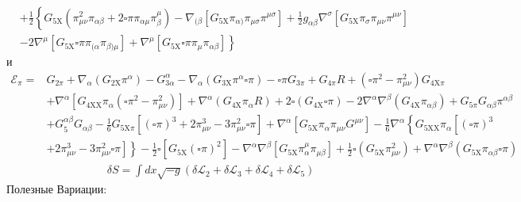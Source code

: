 \documentclass[12pt,a4paper,svgnames]{extarticle}
\begin{document}
\begin{align*}
&+\frac{1}{2}\left\{G_{5 \mathrm{X}}\left(\pi_{\mu \nu}^{2} \pi_{\alpha \beta}+2 \square \pi \pi_{\alpha \mu} \pi_{\beta}^{\mu}\right)-\nabla_{(\beta}\left[G_{5 \mathrm{X}} \pi_{\alpha)} \pi_{\mu \sigma} \pi^{\mu \sigma}\right]+\frac{1}{2} g_{\alpha \beta} \nabla^{\sigma}\left[G_{5 \mathrm{X}} \pi_{\sigma} \pi_{\mu \nu} \pi^{\mu \nu}\right]\right.\\
&\left.-2 \nabla^{\mu}\left[G_{5 \mathrm{X}} \square \pi \pi_{(\alpha} \pi_{\beta) \mu}\right]+\nabla^{\mu}\left[G_{5 \mathrm{X}} \square \pi \pi_{\mu} \pi_{\alpha \beta}\right]\right\}
\end{align*}
и 
\begin{align*}
\mathcal{E}_{\pi}=& G_{2 \pi}+\nabla_{\alpha}\left(G_{2 \mathrm{X}} \pi^{\alpha}\right)-G_{3 \alpha}^{\alpha}-\nabla_{\alpha}\left(G_{3 \mathrm{X}} \pi^{\alpha} \square \pi\right)-\square \pi G_{3 \pi}+G_{4 \pi} R+\left(\square \pi^{2}-\pi_{\mu \nu}^{2}\right) G_{4 \mathrm{X} \pi} \\
&+\nabla^{\alpha}\left[G_{4 \mathrm{XX}} \pi_{\alpha}\left(\square \pi^{2}-\pi_{\mu \nu}^{2}\right)\right]+\nabla^{\alpha}\left(G_{4 \mathrm{X}} \pi_{\alpha} R\right)+2 \square\left(G_{4 \mathrm{X}} \square \pi\right)-2 \nabla^{\alpha} \nabla^{\beta}\left(G_{4 \mathrm{X}} \pi_{\alpha \beta}\right)+G_{5 \pi} G_{\alpha \beta} \pi^{\alpha \beta} \\
&+G_{5}^{\alpha \beta} G_{\alpha \beta}-\frac{1}{6} G_{5 \mathrm{X} \pi}\left[(\square \pi)^{3}+2 \pi_{\mu \nu}^{3}-3 \pi_{\mu \nu}^{2} \square \pi\right]+\nabla^{\alpha}\left[G_{5 \mathrm{X}} \pi_{\alpha} \pi_{\mu \nu} G^{\mu \nu}\right]-\frac{1}{6} \nabla^{\alpha}\left\{G_{5 \mathrm{XX}} \pi_{\alpha}\left[(\square \pi)^{3}\right.\right.\\
&\left.\left.+2 \pi_{\mu \nu}^{3}-3 \pi_{\mu \nu}^{2} \square \pi\right]\right\}-\frac{1}{2} \square\left[G_{5 \mathrm{X}}(\square \pi)^{2}\right]-\nabla^{\alpha} \nabla^{\beta}\left[G_{5 \mathrm{X}} \pi_{\alpha}^{\mu} \pi_{\mu \beta}\right]+\frac{1}{2} \square\left(G_{5 \mathrm{X}} \pi_{\mu \nu}^{2}\right)+\nabla^{\alpha} \nabla^{\beta}\left(G_{5 \mathrm{X}} \pi_{\alpha \beta} \square \pi\right)
\end{align*}
\newpage
\begin{align*}
	& \delta S = \int dx \sqrt{-g} \left(\delta \mathcal{L}_{2} + \delta \mathcal{L}_{3} + \delta \mathcal{L}_{4} + \delta \mathcal{L}_{5}\right)
\end{align*}
Полезные Вариации:
\end{document}

